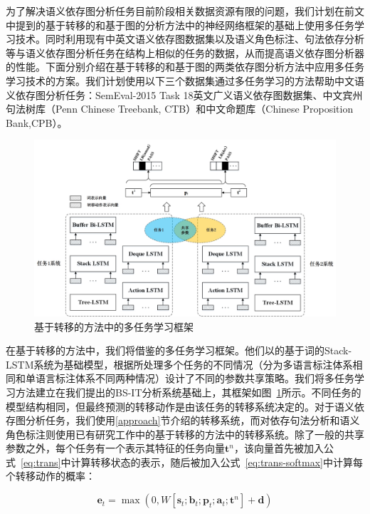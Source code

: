 为了解决语义依存图分析任务目前阶段相关数据资源有限的问题，我们计划在前文中提到的基于转移的和基于图的分析方法中的神经网络框架的基础上使用多任务学习技术。同时利用现有中英文语义依存图数据集以及语义角色标注、句法依存分析等与语义依存图分析任务在结构上相似的任务的数据，从而提高语义依存图分析器的性能。下面分别介绍在基于转移的和基于图的两类依存图分析方法中应用多任务学习技术的方案。我们计划使用以下三个数据集通过多任务学习的方法帮助中文语义依存图分析任务：SemEval-2015 Task 18英文广义语义依存图数据集、中文宾州句法树库（Penn Chinese Treebank, CTB）和中文命题库（Chinese Proposition Bank,CPB）。

\begin{figure}[hbtp]
	\centering
	\includegraphics[width=120mm]{picture/mtl.jpg}
	\caption{基于转移的方法中的多任务学习框架}
	\label{fig:mtl}
\end{figure}

在基于转移的方法中，我们将借鉴的多任务学习框架。他们以的基于词的Stack-LSTM系统为基础模型，根据所处理多个任务的不同情况（分为多语言标注体系相同和单语言标注体系不同两种情况）设计了不同的参数共享策略。我们将多任务学习方法建立在我们提出的BS-IT分析系统基础上，其框架如图~\ref{fig:mtl}所示。不同任务的模型结构相同，但最终预测的转移动作是由该任务的转移系统决定的。对于语义依存图分析任务，我们使用\ref{approach}节介绍的转移系统，而对依存句法分析和语义角色标注则使用已有研究工作中的基于转移的方法中的转移系统。除了一般的共享参数之外，每个任务有一个表示其特征的任务向量$\mathbf{t}^n$，该向量首先被加入公式~\ref{eq:trans}中计算转移状态的表示，随后被加入公式~\ref{eq:trans-softmax}中计算每个转移动作的概率：

\begin{equation}
\mathbf{e}_t=\max(0,W[\mathbf{s}_t;\mathbf{b}_t; \mathbf{p}_t; \mathbf{a}_t;\mathbf{t}^n ]+\mathbf{d})
\end{equation}

